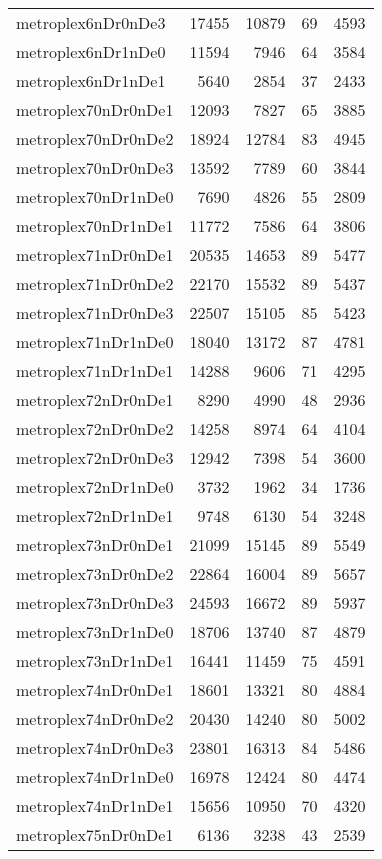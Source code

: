 \begin{tabular}{lrrrr}
metroplex6nDr0nDe3 & 17455 & 10879 & 69 & 4593 \\
metroplex6nDr1nDe0 & 11594 & 7946 & 64 & 3584 \\
metroplex6nDr1nDe1 & 5640 & 2854 & 37 & 2433 \\
metroplex70nDr0nDe1 & 12093 & 7827 & 65 & 3885 \\
metroplex70nDr0nDe2 & 18924 & 12784 & 83 & 4945 \\
metroplex70nDr0nDe3 & 13592 & 7789 & 60 & 3844 \\
metroplex70nDr1nDe0 & 7690 & 4826 & 55 & 2809 \\
metroplex70nDr1nDe1 & 11772 & 7586 & 64 & 3806 \\
metroplex71nDr0nDe1 & 20535 & 14653 & 89 & 5477 \\
metroplex71nDr0nDe2 & 22170 & 15532 & 89 & 5437 \\
metroplex71nDr0nDe3 & 22507 & 15105 & 85 & 5423 \\
metroplex71nDr1nDe0 & 18040 & 13172 & 87 & 4781 \\
metroplex71nDr1nDe1 & 14288 & 9606 & 71 & 4295 \\
metroplex72nDr0nDe1 & 8290 & 4990 & 48 & 2936 \\
metroplex72nDr0nDe2 & 14258 & 8974 & 64 & 4104 \\
metroplex72nDr0nDe3 & 12942 & 7398 & 54 & 3600 \\
metroplex72nDr1nDe0 & 3732 & 1962 & 34 & 1736 \\
metroplex72nDr1nDe1 & 9748 & 6130 & 54 & 3248 \\
metroplex73nDr0nDe1 & 21099 & 15145 & 89 & 5549 \\
metroplex73nDr0nDe2 & 22864 & 16004 & 89 & 5657 \\
metroplex73nDr0nDe3 & 24593 & 16672 & 89 & 5937 \\
metroplex73nDr1nDe0 & 18706 & 13740 & 87 & 4879 \\
metroplex73nDr1nDe1 & 16441 & 11459 & 75 & 4591 \\
metroplex74nDr0nDe1 & 18601 & 13321 & 80 & 4884 \\
metroplex74nDr0nDe2 & 20430 & 14240 & 80 & 5002 \\
metroplex74nDr0nDe3 & 23801 & 16313 & 84 & 5486 \\
metroplex74nDr1nDe0 & 16978 & 12424 & 80 & 4474 \\
metroplex74nDr1nDe1 & 15656 & 10950 & 70 & 4320 \\
metroplex75nDr0nDe1 & 6136 & 3238 & 43 & 2539 \\

\end{tabular}
